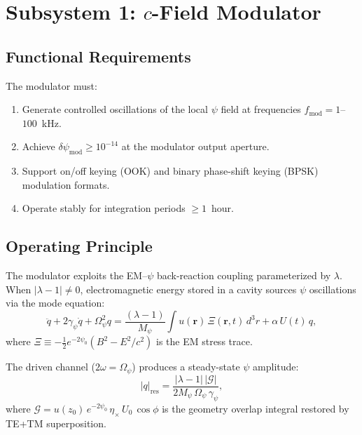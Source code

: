 \documentclass[11pt,letterpaper]{article}
\newcommand{\psifield}{\psi}
\begin{document}
\section{Subsystem 1: $c$-Field Modulator}
\label{sec:modulator}

\subsection{Functional Requirements}

The modulator must:
\begin{enumerate}[label=M\arabic*.]
\item Generate controlled oscillations of the local
$\psifield$ field at frequencies $f_\text{mod} = 1$--$100$~kHz.
\item Achieve $\delta\psifield_\text{mod} \geq 10^{-14}$ at the
modulator output aperture.
\item Support on/off keying (OOK) and binary phase-shift keying
(BPSK) modulation formats.
\item Operate stably for integration periods $\geq 1$~hour.
\end{enumerate}

\subsection{Operating Principle}

The modulator exploits the EM--$\psifield$ back-reaction coupling
parameterized by $\lambda$. When $|\lambda-1| \neq 0$,
electromagnetic energy stored in a cavity sources $\psifield$
oscillations via the mode equation:
\begin{equation}
\ddot{q} + 2\gamma_\psi\dot{q} + \Omega_\psi^2 q
= \frac{(\lambda-1)}{M_\psi}\int u(\mathbf{r})\,
\Xi(\mathbf{r},t)\,d^3r + \alpha\,U(t)\,q,
\label{eq:mode_eq}
\end{equation}
where $\Xi \equiv -\frac{1}{2}e^{-2\psi_0}(B^2 - E^2/c^2)$ is the
EM stress trace.

The driven channel ($2\omega = \Omega_\psi$) produces a steady-state
$\psifield$ amplitude:
\begin{equation}
|q|_\text{res} = \frac{|\lambda-1|\,|\mathcal{G}|}
{2M_\psi\,\Omega_\psi\,\gamma_\psi},
\label{eq:q_res}
\end{equation}
where $\mathcal{G} = u(z_0)\,e^{-2\psi_0}\,\eta_\times\,U_0\,
\cos\phi$ is the geometry overlap integral restored by TE+TM
superposition.
\end{document}
